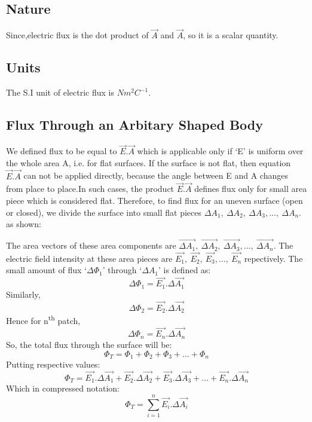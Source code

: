 \subsection*{Nature}
Since,electric flux is the dot product of $\vec{A}$ and $\vec{A}$, so it is a scalar quantity.

\subsection*{Units}
The S.I unit of electric flux is $Nm^{2}C^{-1}$.
\subsection{Flux Through an Arbitary Shaped Body}
We defined flux to be equal to $\vec{E}.\vec{A}$ which is applicable
only if `E' is uniform over the whole area A, i.e. for flat surfaces.
If the surface is not flat, then equation $\vec{E}.\vec{A}$ can not be
applied directly, because the angle between E and A changes from place
to place.In such cases, the product $\vec{E}.\vec{A}$ defines flux only
for small area piece which is considered flat. Therefore, to find flux for
an uneven surface (open or closed), we divide the surface into small flat
pieces $\Delta A_{1},\:\Delta A_{2},\:\Delta A_{3},...,\:\Delta A_{n}$.
as shown:



The area vectors of these area components are $\vec{\Delta A_{1}},\:\vec{\Delta A_{2}},\:\vec{\Delta A_{3}},...,\:\vec{\Delta A_{n}}$.
The electric field intensity at these area pieces are $\vec{E_{1}},\:\vec{E_{2}},\:\vec{E_{3}},...,\:\vec{E_{n}}$ repectively.
The small amount of flux `$\Delta \Phi_{1}$' through `$\Delta A_{1}$' is defined as:
\begin{equation}
  \Delta \Phi_{1} = \vec{E_{1}}.\Delta \vec{A_{1}} \nonumber
\end{equation}
Similarly,
\begin{equation}
  \Delta \Phi_{2} = \vec{E_{2}}.\Delta \vec{A_{2}} \nonumber
\end{equation}
Hence for n\textsuperscript{th} patch, 
\begin{equation}
  \Delta \Phi_{n} = \vec{E_{n}}.\Delta \vec{A_{n}} \nonumber
\end{equation}
So, the total flux through the surface will be:
\begin{equation}
  \Phi_{T} =  \Phi_{1}+ \Phi_{2}+ \Phi_{3}+...+ \Phi_{n} \nonumber
\end{equation}
Putting respective values:
\begin{equation}
  \Phi_{T} = \vec{E_{1}}.\Delta \vec{A_{1}}+\vec{E_{2}}.\Delta \vec{A_{2}} +\vec{E_{3}}.\Delta \vec{A_{3}}+...+\vec{E_{n}}.\Delta \vec{A_{n}} \nonumber
\end{equation}
Which in compressed notation:
\begin{equation} \label{eq:11.19}
  \Phi_{T} = \sum_{i=1}^{n} \vec{E_{i}}.\Delta \vec{A_{i}} 
\end{equation}
